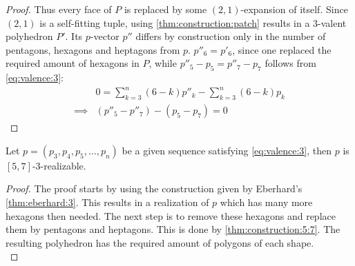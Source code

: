 \begin{construction}
\begin{proof}
    Thus every face of $P$ is replaced by some $(2, 1)$-expansion of itself. Since $(2, 1)$ is a self-fitting tuple, using \autoref{thm:construction:patch} results in a $3$-valent polyhedron $P'$. Its $p$-vector $p''$ differs by construction only in the number of pentagons, hexagons and heptagons from $p$. $p''_6 = p'_6$, since one replaced the required amount of hexagons in $P$, while $p''_5 - p_5 = p''_7 - p_7$ follows from \autoref{eq:valence:3}:
    \begin{align*}
      &0 = \sum_{k=3}^n \left(6 - k \right) p''_k - \sum_{k=3}^n \left(6 - k \right) p_k \\
      \implies & (p''_5 - p''_7) - (p_5 -p_7) = 0
    \end{align*}
  \end{proof}
\end{construction}

\begin{corollary}
  Let $p = (p_3, p_4, p_5, \dots, p_n)$ be a given sequence satisfying \autoref{eq:valence:3}, then $p$ is $[5, 7]$-$3$-realizable.
  \begin{proof}
    The proof starts by using the construction given by Eberhard's \autoref{thm:eberhard:3}. This results in a realization of $p$ which has many more hexagons then needed. The next step is to remove these hexagons and replace them by pentagons and heptagons. This is done by \autoref{thm:construction:5:7}. The resulting polyhedron has the required amount of polygons of each shape.\\
  \end{proof}
\end{corollary}
